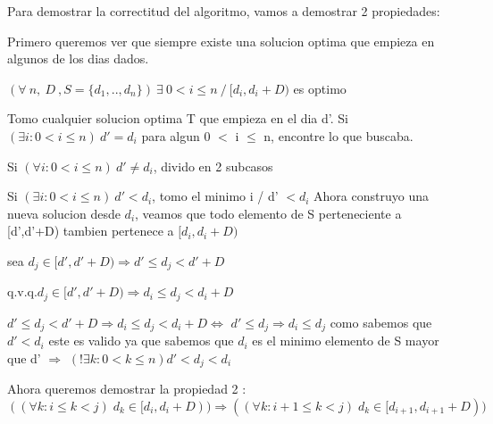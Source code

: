Para demostrar la correctitud del algoritmo, vamos a demostrar 2 propiedades:

Primero queremos ver que siempre existe una solucion optima que empieza en algunos de los dias dados.

$(\forall \ n,\ D\ , S = \{d_1,..,d_n\} ) \ \exists \ 0 < i \leq n \ / \ [d_i,d_i + D )$ es optimo 

Tomo cualquier solucion optima T que empieza en el dia d'.
Si $(\exists i: 0 < i\leq n ) \ d' = d_i$ para algun 0 $<$ i $\leq$ n, encontre lo que buscaba.

Si $(\forall i: 0<i \leq n) \  d' \neq d_i$, divido en 2 subcasos

Si $(\exists i: 0<i\leq n) \ d' < d_i$, tomo el minimo i / d' $< d_i$
Ahora construyo una nueva solucion desde $d_i$, veamos que todo elemento de S perteneciente a [d',d'+D) tambien pertenece a $[d_i,d_i +D)$

sea $d_j \in [d',d'+D) \Rightarrow d' \leq d_j < d'+D $

q.v.q.$ d_j \in  [d',d'+D) \Rightarrow d_i \leq d_j < d_i+D $

$ d' \leq d_j < d'+D \Rightarrow d_i \leq d_j < d_i+D  \Leftrightarrow$    
$ d' \leq d_j \Rightarrow d_i \leq d_j$  como sabemos que $d' < d_i$
este es valido ya que sabemos que $d_i$ es el minimo elemento de S mayor que d' $\Rightarrow$ 
$( !\exists k: 0 < k \leq n) d' < d_j < d_i$

Ahora queremos demostrar la propiedad 2 : $((\forall k: i \leq k < j)\;d_k \in [d_i, d_i + D)) \Rightarrow ((\forall k: i + 1 \leq k < j)\;d_k \in [d_{i+1}, d_{i+1} + D))$